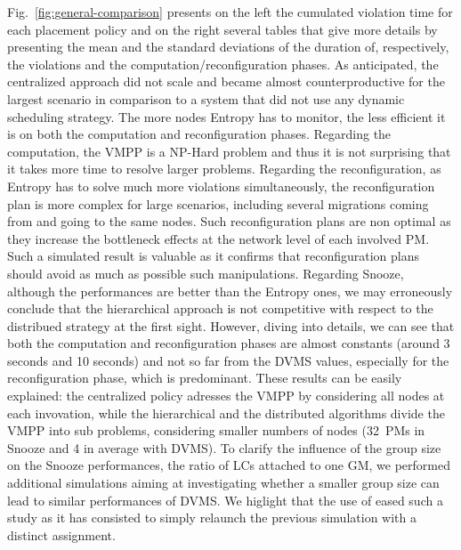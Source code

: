 Fig.~\ref{fig:general-comparison} presents on the left the cumulated violation
time for each placement policy and on the right several tables that give more details by presenting the
mean and the standard deviations of the duration of, respectively, the
violations and the computation/reconfiguration phases. As
anticipated, the centralized approach did not scale and became almost
counterproductive for the largest scenario in comparison to a system
that did not use any dynamic scheduling strategy. The more nodes Entropy has to
monitor, the less efficient it is on both the computation and
reconfiguration phases. Regarding the computation, the VMPP is a
NP-Hard problem and thus it is not surprising that it takes more time
to resolve larger problems. Regarding the reconfiguration, as Entropy
has to solve much more violations simultaneously, the reconfiguration plan
is more complex for large scenarios, including several migrations
coming from and going to the same nodes. Such reconfiguration plans
are non optimal as they increase the bottleneck effects at the network
level of each involved PM. Such a simulated result is valuable as it confirms
that reconfiguration plans should avoid as much as possible such
manipulations.
%
Regarding Snooze, although the performances are better than the
Entropy ones, we may erroneously conclude that the hierarchical
approach is not competitive with respect to the distribued strategy at
the first sight. However, diving into details, we can see that both
the computation and reconfiguration phases are almost constants
(around 3 seconds and 10 seconds) and not so far from the DVMS values,
especially for the reconfiguration phase, which is predominant. These
results can be easily explained: the centralized policy adresses the
VMPP by considering all nodes at each invovation, while the
hierarchical and the distributed algorithms divide the VMPP into sub
problems, considering smaller numbers of nodes (32~PMs in Snooze and
4 in average with DVMS). To clarify the influence of the group size on
the Snooze performances, \ie the ratio of LCs attached to one GM, we
performed additional simulations aiming at investigating whether a
smaller group size can lead to similar performances of DVMS. We
higlight that the use of \vmps eased such a study as it has consisted
to simply relaunch the previous simulation with a distinct
assignment.


